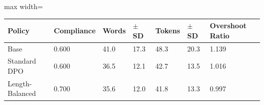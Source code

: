 \begin{adjustbox}{max width=\linewidth}
\begin{tabular}{lllllll}
\toprule
Policy & Compliance & Words & $\pm$ SD & Tokens & $\pm$ SD & Overshoot Ratio \\
\midrule
Base & 0.600 & 41.0 & 17.3 & 48.3 & 20.3 & 1.139 \\
Standard DPO & 0.600 & 36.5 & 12.1 & 42.7 & 13.5 & 1.016 \\
Length-Balanced & 0.700 & 35.6 & 12.0 & 41.8 & 13.3 & 0.997 \\
\bottomrule
\end{tabular}
\end{adjustbox}
